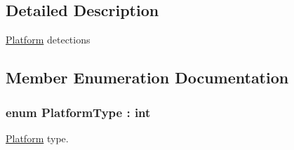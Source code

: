 \subsection{Detailed Description}
\hyperlink{classOTA_1_1Misc_1_1Platform}{Platform} detections 



\subsection{Member Enumeration Documentation}
\hypertarget{classOTA_1_1Misc_1_1Platform_a118d12ed2cb6c6d4ebd67a9891b95d5f}{}
\subsubsection[{Platform\+Type}]{\setlength{\rightskip}{0pt plus 5cm}enum {\bf Platform\+Type} \+: int\hspace{0.3cm}{\ttfamily [strong]}}\label{classOTA_1_1Misc_1_1Platform_a118d12ed2cb6c6d4ebd67a9891b95d5f}


\hyperlink{classOTA_1_1Misc_1_1Platform}{Platform} type. 

